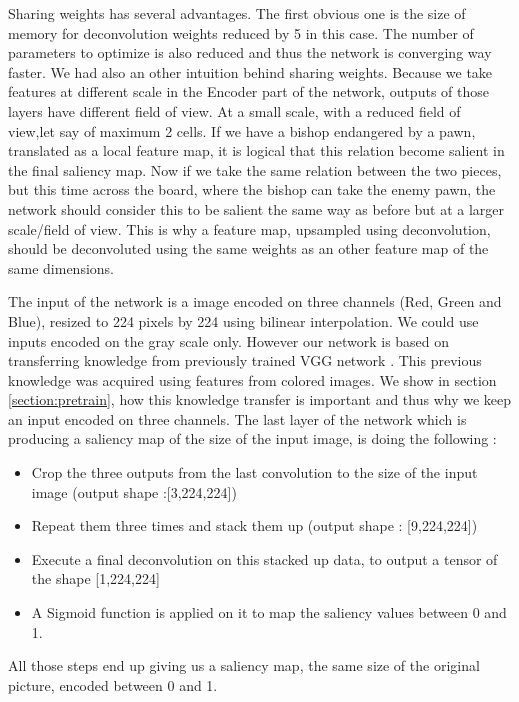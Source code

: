 Sharing weights has several advantages. The first obvious one is the size of memory for deconvolution weights reduced by 5 in this case. The number of parameters to optimize is also reduced and thus the network is converging way faster.
We had also an other intuition behind sharing weights. Because we take features at different scale in the Encoder part of the network, outputs of those layers have different field of view. At a small scale, with a reduced field of view,let say of maximum 2 cells. If we have a bishop endangered by a pawn, translated as a local feature map, it is logical that this relation become salient in the final saliency map. Now if we take the same relation between the two pieces, but this time across the board, where the bishop can take the enemy pawn, the network should consider this to be salient the same way as before but at a larger scale/field of view. This is why a feature map, upsampled using deconvolution, should be deconvoluted using the same weights as an other feature map of the same dimensions.


The input of the network is a image encoded on three channels (Red, Green and Blue), resized to 224 pixels by 224 using bilinear interpolation. We could use inputs encoded on the gray scale only. However our network is based on transferring knowledge from previously trained VGG network \cite{DBLP:journals/corr/SimonyanZ14a}. This previous knowledge was acquired using features from colored images. We show in section \ref{section:pretrain}, how this knowledge transfer is important and thus why we keep an input encoded on three channels. The last layer of the network which is producing a saliency map of the size of the input image, is doing the following :
\begin{itemize}
    \item Crop the three outputs from the last convolution to the size of the input image (output shape :[3,224,224]) 
    \item Repeat them three times and stack them up (output shape : [9,224,224])
    \item Execute a final deconvolution on this stacked up data, to output a tensor of the shape [1,224,224]
    \item A Sigmoid function is applied on it to map the saliency values between 0 and 1.
\end{itemize}

All those steps end up giving us a saliency map, the same size of the original picture, encoded between 0 and 1.

